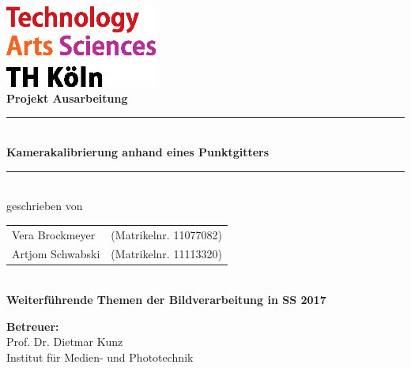 \thispagestyle{empty}
\begin{center}
	\includegraphics[width=5cm]{Images/logo_TH}\\[12ex]
	{\Huge\textbf{Projekt Ausarbeitung}}\\[8ex]
	\rule{.8\textwidth}{.2pt}
	{\Large\\[1ex] \textbf{Kamerakalibrierung anhand eines Punktgitters }}\\
	\rule{.8\textwidth}{.2pt}\\[10ex]
	geschrieben von\\[2ex]
	\begin{tabular}{ll}
		Vera Brockmeyer &(Matrikelnr. 11077082)\\
		Artjom Schwabski &(Matrikelnr. 11113320)\\
	\end{tabular}\\[10ex]
	\textbf{Weiterführende Themen der Bildverarbeitung in SS 2017}\\			
\end{center}
\vfill
\begin{flushleft}
	{\bf Betreuer:}\\
	Prof. Dr. Dietmar Kunz\\
	Institut für Medien- und Phototechnik
\end{flushleft}
\newpage